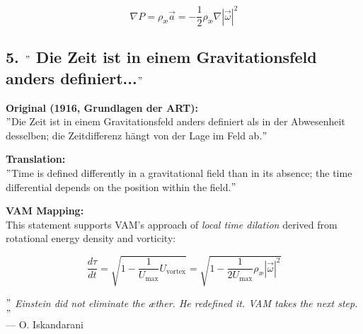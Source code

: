 \[
\nabla P = \rho_\text{\ae} \vec{a} = -\frac{1}{2} \rho_\text{\ae} \nabla |\vec{\omega}|^2
\]

\subsection*{5. \("\) Die Zeit ist in einem Gravitationsfeld anders definiert...\("\)}
\textbf{Original (1916, Grundlagen der ART):} \\
\("\)Die Zeit ist in einem Gravitationsfeld anders definiert als in der Abwesenheit desselben; die Zeitdifferenz hängt von der Lage im Feld ab.\("\)

\textbf{Translation:} \\
\("\)Time is defined differently in a gravitational field than in its absence; the time differential depends on the position within the field.\("\)

\textbf{VAM Mapping:} \\
This statement supports VAM's approach of \emph{local time dilation} derived from rotational energy density and vorticity:

\[
\frac{d\tau}{dt} = \sqrt{1 - \frac{1}{U_\text{max}} U_{\text{vortex}}} = \sqrt{1 - \frac{1}{2U_\text{max}} \rho_\text{\ae} |\vec{\omega}|^2}
\]

\bigskip
\textit{ \("\) Einstein did not eliminate the æther. He redefined it. VAM takes the next step. \("\)}\\
\hfill — O. Iskandarani\\
